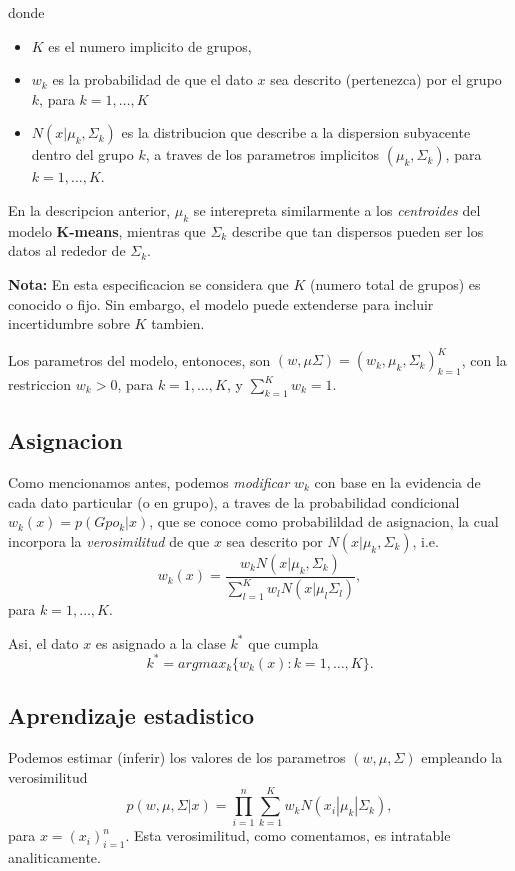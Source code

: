 \documentclass[11pt,]{article}
\begin{document}
donde

\begin{itemize}
\item
  \(K\) es el numero implicito de grupos,
\item
  \(w_{k}\) es la probabilidad de que el dato \(x\) sea descrito
  (pertenezca) por el grupo \(k\), para \(k=1,\ldots,K\)
\item
  \(N(x|\mu_k,\Sigma_k)\) es la distribucion que describe a la
  dispersion subyacente dentro del grupo \(k\), a traves de los
  parametros implicitos \((\mu_k,\Sigma_k)\), para \(k=1,\ldots,K\).
\end{itemize}

En la descripcion anterior, \(\mu_k\) se interepreta similarmente a los
\emph{centroides} del modelo \textbf{K-means}, mientras que \(\Sigma_k\)
describe que tan dispersos pueden ser los datos al rededor de
\(\Sigma_k\).

\textbf{Nota:} En esta especificacion se considera que \(K\) (numero
total de grupos) es conocido o fijo. Sin embargo, el modelo puede
extenderse para incluir incertidumbre sobre \(K\) tambien.

Los parametros del modelo, entonoces, son
\((w,\mu\Sigma)=(w_k,\mu_k,\Sigma_{k})_{k=1}^{K}\), con la restriccion
\(w_{k} > 0\), para \(k=1,\ldots,K\), y \(\sum_{k=1}^{K}w_k=1\).

\subsection{Asignacion}\label{asignacion-1}

Como mencionamos antes, podemos \emph{modificar} \(w_{k}\) con base en
la evidencia de cada dato particular (o en grupo), a traves de la
probabilidad condicional \(w_{k}(x)=p(Gpo_{k}|x)\), que se conoce como
probabilildad de asignacion, la cual incorpora la \emph{verosimilitud}
de que \(x\) sea descrito por \(N(x|\mu_k,\Sigma_k)\), i.e. \[
w_{k}(x)=\frac{w_k N(x|\mu_k,\Sigma_{k})}{\sum_{l=1}^{K}w_lN(x|\mu_l\Sigma_l)},
\] para \(k=1,\ldots,K\).

Asi, el dato \(x\) es asignado a la clase \(k^{*}\) que cumpla \[
k^{*} = argmax_{k}\{w_k(x):k=1,\ldots,K\}.
\]

\subsection{Aprendizaje estadistico}\label{aprendizaje-estadistico}

Podemos estimar (inferir) los valores de los parametros
\((w,\mu,\Sigma)\) empleando la verosimilitud \[
p(w,\mu,\Sigma|x)=\prod_{i=1}^{n}\sum_{k=1}^{K}w_kN(x_i|\mu_k|\Sigma_{k}),
\] para \(x=(x_i)^{n}_{i=1}\). Esta verosimilitud, como comentamos, es
intratable analiticamente.
\end{document}
